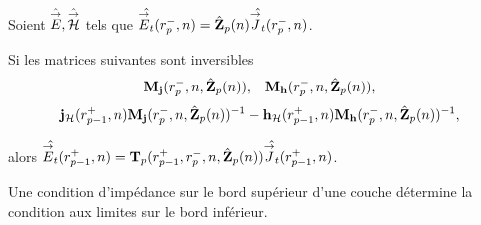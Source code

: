     \begin{prop}%
      \label{prop:sphere:transfert:impedance}

      Soient \(\hat{{\overset{\rightarrow}{E}}},\hat{{\overset{\rightarrow}{\mathcal{H}}}}\) tels que \(\hat{{\overset{\rightarrow}{E}}_t}(r_{p}^-,n) = \hat{\mathbf{Z}}_{p}(n)\hat{{\overset{\rightarrow}{J}}_t}(r_{p}^-,n)\).

      Si les matrices suivantes sont inversibles
      \begin{align*}
        \mathbf{M}_{\mathbf{j}}(r_p^-,n,\hat{\mathbf{Z}}_{p}(n)), && \mathbf{M}_{\mathbf{h}}(r_p^-,n,\hat{\mathbf{Z}}_{p}(n)),
      \end{align*}
      \begin{align*}
        \mathbf{j}_{\mathcal{H}}(r_{p-1}^+,n)\mathbf{M}_{\mathbf{j}}(r_{p}^-,n,\hat{\mathbf{Z}}_{p}(n))^{-1} - \mathbf{h}_{\mathcal{H}}(r_{p-1}^+,n)\mathbf{M}_{\mathbf{h}}(r_{p}^-,n,\hat{\mathbf{Z}}_{p}(n))^{-1},
      \end{align*}

      alors \(\hat{{\overset{\rightarrow}{E}}_t}(r_{p-1}^+,n) = \mathbf{T}_p(r_{p-1}^+,r_{p}^-,n,\hat{\mathbf{Z}}_{p}(n))\hat{{\overset{\rightarrow}{J}}_t}(r_{p-1}^+,n)\).

      Une condition d'impédance sur le bord supérieur d'une couche détermine la condition aux limites sur le bord inférieur.
    \end{prop}


